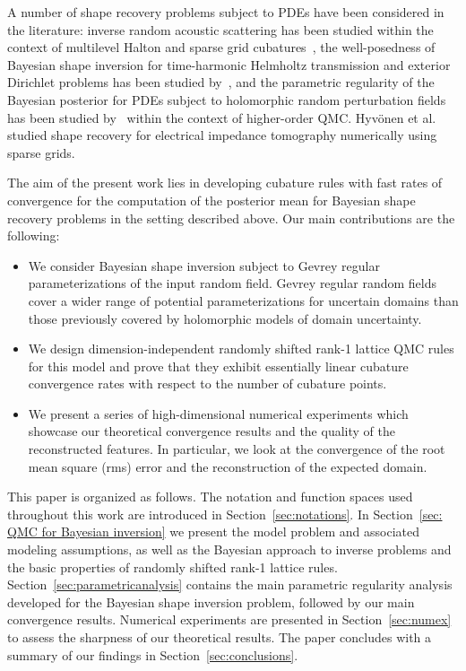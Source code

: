 \documentclass[graybox]{svmult}
\begin{document}
A number of shape recovery problems subject to PDEs have been considered in the literature: inverse random acoustic scattering has been studied within the context of multilevel Halton and sparse grid cubatures~\cite{dolz}, the well-posedness of Bayesian shape inversion for time-harmonic Helmholtz transmission and exterior Dirichlet problems has been studied by~\cite{scarabosio24}, and the parametric regularity of the Bayesian posterior for PDEs subject to holomorphic random perturbation fields has been studied by~\cite{gantnerpeters18} within the context of higher-order QMC. Hyv\"onen et al.~\cite{hyvonen17} studied shape recovery for electrical impedance tomography numerically using sparse grids. 

The aim of the present work lies in developing cubature rules with fast rates of convergence for the computation of the posterior mean for Bayesian shape recovery problems in the setting described above. Our main contributions are the following: 
\begin{itemize} 
    \item We consider Bayesian shape inversion subject to Gevrey regular parameterizations of the input random field. Gevrey regular random fields cover a wider range of potential parameterizations for uncertain domains than those previously covered by  holomorphic models of domain uncertainty.
    \item We design dimension-independent randomly shifted rank-1 lattice QMC rules for this model and prove that they exhibit essentially linear cubature convergence rates with respect to the number of cubature points. 
    \item We present a series of high-dimensional numerical experiments which showcase our theoretical convergence results and the quality of the reconstructed features. In particular, we look at the convergence of the root mean square (rms) error and the reconstruction of the expected domain. 
\end{itemize}

This paper is organized as follows. The  notation and function spaces used throughout this work are introduced in Section~\ref{sec:notations}. In Section~\ref{sec: QMC for Bayesian inversion} we present the model problem and associated modeling assumptions, as well as the Bayesian approach to inverse problems and the basic properties of randomly shifted rank-1 lattice rules. Section~\ref{sec:parametricanalysis} contains the main parametric regularity analysis developed for the Bayesian shape inversion problem, followed by our main convergence results. Numerical experiments are presented in Section~\ref{sec:numex} to assess the sharpness of our theoretical results. The paper concludes with a summary of our findings in Section~\ref{sec:conclusions}.
\end{document}
